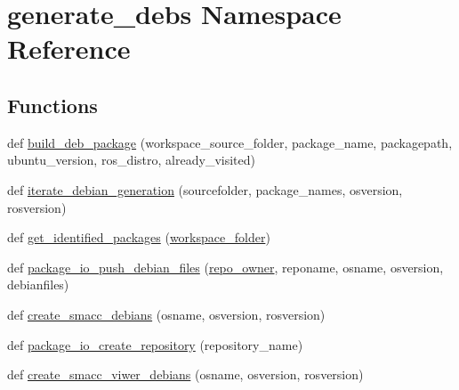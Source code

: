 \hypertarget{namespacegenerate__debs}{}\section{generate\+\_\+debs Namespace Reference}
\label{namespacegenerate__debs}
\subsection*{Functions}
\begin{DoxyCompactItemize}
\item 
def \hyperlink{namespacegenerate__debs_aa70c3f4917ddc57b13eaed8501f571a8}{build\+\_\+deb\+\_\+package} (workspace\+\_\+source\+\_\+folder, package\+\_\+name, packagepath, ubuntu\+\_\+version, ros\+\_\+distro, already\+\_\+visited)
\item 
def \hyperlink{namespacegenerate__debs_ad76fdfddc2dad3b2dc5b98239c6125d5}{iterate\+\_\+debian\+\_\+generation} (sourcefolder, package\+\_\+names, osversion, rosversion)
\item 
def \hyperlink{namespacegenerate__debs_aa91b87c6d9c3ed04015845cc9298431a}{get\+\_\+identified\+\_\+packages} (\hyperlink{namespacegenerate__debs_acb69863b90257249a30e43ebacfb8bd8}{workspace\+\_\+folder})
\item 
def \hyperlink{namespacegenerate__debs_a1c65701328cab8c777b58c75f8d325e8}{package\+\_\+io\+\_\+push\+\_\+debian\+\_\+files} (\hyperlink{namespacegenerate__debs_a23479dba5af50c90f3346b04d441ab2b}{repo\+\_\+owner}, reponame, osname, osversion, debianfiles)
\item 
def \hyperlink{namespacegenerate__debs_ad2e4e864bf753dbb1ed9a58436739905}{create\+\_\+smacc\+\_\+debians} (osname, osversion, rosversion)
\item 
def \hyperlink{namespacegenerate__debs_aabab609323683db61e505e355645ab4a}{package\+\_\+io\+\_\+create\+\_\+repository} (repository\+\_\+name)
\item 
def \hyperlink{namespacegenerate__debs_a1528f55b81a69cda3638628d37813bcf}{create\+\_\+smacc\+\_\+viwer\+\_\+debians} (osname, osversion, rosversion)
\end{DoxyCompactItemize}
